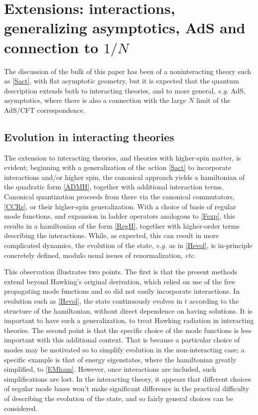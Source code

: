 \documentclass[11pt]{article}
\numberwithin{equation}{section}
\begin{document}
\section{Extensions: interactions, generalizing asymptotics, AdS and connection to $1/N$}

The discussion of the bulk of this paper has been of a noninteracting theory such as \eqref{Sact}, with flat asymptotic geometry, but it is expected that the quantum description extends both to interacting theories, and to more general, {\it e.g.} AdS, asymptotics, where there is also a connection with the large $N$ limit of the AdS/CFT correspondence.

\subsection{Evolution in interacting theories}

The extension to interacting theories, and theories with higher-spin matter, is evident; beginning with a generalization of the action \eqref{Sact} to incorporate interactions and/or higher spin, 
 the canonical approach yields a hamiltonian of the quadratic  form \eqref{ADMH}, together with additional interaction terms.  Canonical quantization proceeds from there via the canonical commutators, \eqref{CCRs}, or their higher-spin generalization.  With a choice of basis of regular mode functions, and expansion in ladder operators analogous to \eqref{Fexp}, this results in a hamiltonian of the form \eqref{RegH}, together with higher-order terms describing the interactions.  While, as expected, this can result in more complicated dynamics, the evolution of the state, {\it e.g.} as in \eqref{Hevol}, is in-principle concretely defined, modulo usual issues of renormalization, {\it etc.} 

This observation illustrates two points.  The first is that the present methods extend beyond Hawking's original derivation\cite{Hawk}, which relied on use of the free propagating mode functions and so did not easily incorporate interactions.  In evolution such as \eqref{Hevol}, the state continuously evolves in $t$ according to the structure of the hamiltonian, without direct dependence on having solutions.  It is important to have such a generalization, to treat Hawking radiation in interacting theories.  The second point is that the specific choice of the mode functions is less important with this additional context.  That is because a particular choice of modes may be motivated so to simplify evolution in the non-interacting case; a specific example is that of energy eigenstates, where the hamiltonian greatly simplified, to \eqref{EMham}.  However, once interactions are included, such simplifications are lost.  In the interacting theory, it appears that different choices of regular mode bases won't make significant difference in the practical difficulty of describing the evolution of the state, and so fairly general choices can be considered.
\end{document}
